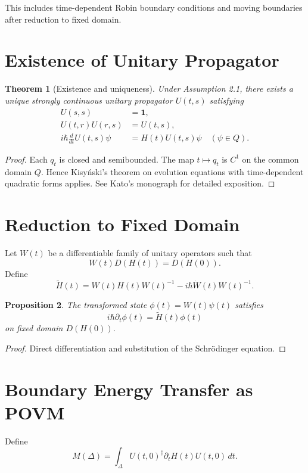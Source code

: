 \documentclass[11pt,a4paper]{article}
\newtheorem{theorem}{Theorem}[section]
\newtheorem{proposition}[theorem]{Proposition}
\begin{document}
This includes time-dependent Robin boundary conditions and moving
boundaries after reduction to fixed domain.

\section{Existence of Unitary Propagator}

\begin{theorem}[Existence and uniqueness]
Under Assumption 2.1, there exists a unique strongly continuous
unitary propagator $U(t,s)$ satisfying
\begin{align*}
U(s,s)&=\mathbf 1,\\
U(t,r)U(r,s)&=U(t,s),\\
i\hbar \frac{d}{dt}U(t,s)\psi &= H(t)U(t,s)\psi
\quad (\psi\in Q).
\end{align*}
\end{theorem}

\begin{proof}
Each $q_t$ is closed and semibounded.
The map $t\mapsto q_t$ is $C^1$ on the common domain $Q$.
Hence Kisy\'nski's theorem on evolution equations with
time-dependent quadratic forms applies.
See Kato's monograph for detailed exposition.
\end{proof}

\section{Reduction to Fixed Domain}

Let $W(t)$ be a differentiable family of unitary operators such that
\[
W(t)D(H(t)) = D(H(0)).
\]
Define
\[
\widetilde H(t)
=
W(t)H(t)W(t)^{-1}
-
i\hbar \dot W(t)W(t)^{-1}.
\]

\begin{proposition}
The transformed state $\phi(t)=W(t)\psi(t)$ satisfies
\[
i\hbar \partial_t \phi(t)
=
\widetilde H(t)\phi(t)
\]
on fixed domain $D(H(0))$.
\end{proposition}

\begin{proof}
Direct differentiation and substitution of the Schr\"odinger equation.
\end{proof}

\section{Boundary Energy Transfer as POVM}

Define
\[
M(\Delta)
=
\int_\Delta
U(t,0)^\dagger
\partial_t H(t)
U(t,0)
\, dt.
\]
\end{document}
